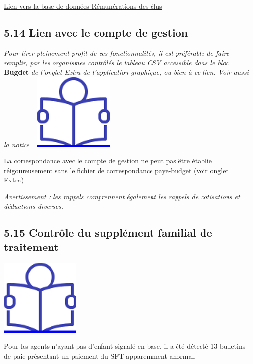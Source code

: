 \href{../Bases/Reglementation/remunerations.elu.csv}{Lien vers la base de
données Rémunérations des élus}

\hypertarget{lien-avec-le-compte-de-gestion}{%
\subsection{5.14 Lien avec le compte de
gestion}\label{lien-avec-le-compte-de-gestion}}

\emph{Pour tirer pleinement profit de ces fonctionnalités, il est
préférable de faire remplir, par les organismes contrôlés le tableau CSV
accessible dans le bloc} \textbf{Bugdet} \emph{de l'onglet Extra de
l'application graphique, ou bien à ce lien. Voir aussi la notice} ~
\href{../Docs/Notices/fiche_tableau_budget.odt}{\includegraphics{icones/Notice.png}}

La correspondance avec le compte de gestion ne peut pas être établie
réigoureusement sans le fichier de correspondance paye-budget (voir
onglet Extra).

\emph{Avertissement : les rappels comprennent également les rappels de
cotisations et déductions diverses.}

\hypertarget{controle-du-supplement-familial-de-traitement}{%
\subsection{5.15 Contrôle du supplément familial de
traitement}\label{controle-du-supplement-familial-de-traitement}}

\href{../Docs/Notices/fiche_SFT.odt}{\includegraphics{icones/Notice.png}}

Pour les agents n'ayant pas d'enfant signalé en base, il a été détecté
13 bulletins de paie présentant un paiement du SFT apparemment anormal.

